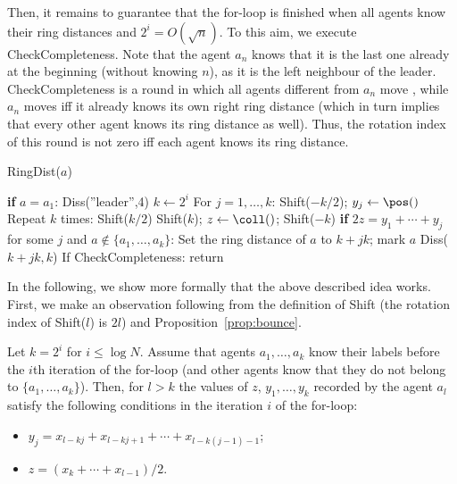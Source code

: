 Then, it remains to guarantee that the for-loop is finished when all agents
know their ring distances and $2^i=O(\sqrt{n})$.
To this aim, we execute CheckCompleteness.
Note that the agent $a_n$ knows
that it is the last one already at the beginning (without knowing $n$), as it is
the left neighbour of the leader.
CheckCompleteness is a round in which all agents different from $a_n$ move
{\lleft}, while $a_n$ moves {\rright} iff it already knows its own
right ring distance (which in turn implies that every other agent knows its ring distance
as well).
Thus, the rotation index of this round is not zero iff each agent knows its ring distance.
\begin{algorithm}[]
	\caption{RingDist($a$)}
	\label{alg:move:perceptive}
	\begin{algorithmic}[1]
\State \textbf{if} $a=a_1$: Diss(''leader'',4)\iffull{}\else{}\fi
        \State $k\gets 2^i$
        \State For $j=1,\ldots,k$: Shift($-k/2$); $y_j\gets\pos()$
        \State Repeat $k$ times: Shift($k/2$) \iffull{}\else{}\fi
        \State Shift($k$); $z\gets \coll()$; Shift($-k$)
        \State \textbf{if} $2z=y_1+\cdots+y_j$ for some $j$
				and $a\not\in\{a_1,\ldots,a_k\}$: 
				\State\phantom{abc}Set the ring distance of $a$ to $k+jk$; mark $a$\iffull{}\else{}\fi
					\State Diss($k+jk,k$)
					\iffull{}\else{}\fi
				\EndIf
\State If CheckCompleteness: return\iffull{}\fi
    \EndFor
\end{algorithmic}
\end{algorithm}
In the following, we show more formally that the above described idea works. First, we make
an observation following from the definition of Shift (the rotation index of Shift($l$) is $2l$)
and Proposition~\ref{prop:bounce}.
\begin{proposition}\label{prop:shift}
Let $k=2^i$ for $i\leq \log N$.
Assume that agents $a_1,\ldots,a_k$ know their labels before the $i$th
iteration of the for-loop (and other agents know that they do not belong
to $\{a_1,\ldots,a_k\}$).
Then, for $l>k$ the values of $z$, $y_1,\ldots,y_k$ recorded by the agent $a_l$ satisfy the following
conditions in the iteration $i$ of the for-loop:
\begin{itemize}
\item $y_j=x_{l-kj}+x_{l-kj+1}+\cdots+x_{l-k(j-1)-1}$;
\item $z=(x_k+\cdots+x_{l-1})/2$.
\end{itemize}
\end{proposition}


